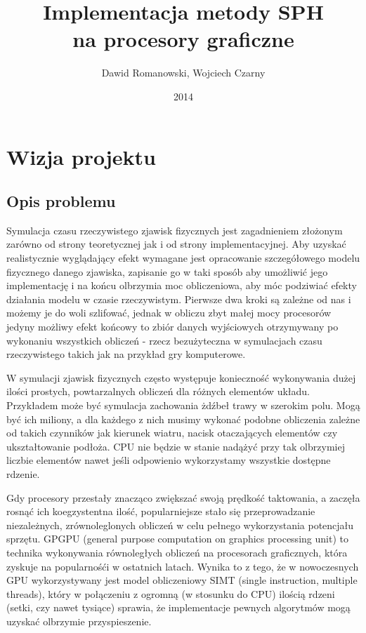 \documentclass[polish, 12pt]{aghthesis}
\author{Dawid Romanowski, Wojciech Czarny}
\title{Implementacja metody SPH \\ na procesory graficzne}
\date{2014}
\begin{document}
\raggedbottom
\maketitle{}

\tableofcontents
\clearpage

\section{Wizja projektu}


	\subsection{Opis problemu}
	
	Symulacja czasu rzeczywistego zjawisk fizycznych jest zagadnieniem złożonym zarówno od strony teoretycznej jak i od strony implementacyjnej. Aby uzyskać realistycznie wyglądający efekt wymagane jest opracowanie szczegółowego modelu fizycznego danego zjawiska, zapisanie go w taki sposób aby umożliwić jego implementację i na końcu olbrzymia moc obliczeniowa, aby móc podziwiać efekty działania modelu w czasie rzeczywistym. Pierwsze dwa kroki są zależne od nas i możemy je do woli szlifować, jednak w obliczu zbyt małej mocy procesorów jedyny możliwy efekt końcowy to zbiór danych wyjściowych otrzymywany po wykonaniu wszystkich obliczeń - rzecz bezużyteczna w symulacjach czasu rzeczywistego takich jak na przykład gry komputerowe.

	W symulacji zjawisk fizycznych często występuje konieczność wykonywania dużej ilości prostych, powtarzalnych obliczeń dla różnych elementów układu. Przykładem może być symulacja zachowania żdźbeł trawy w szerokim polu. Mogą być ich miliony, a dla każdego z nich musimy wykonać podobne obliczenia zależne od takich czynników jak kierunek wiatru, nacisk otaczających elementów czy ukształtowanie podłoża. CPU nie będzie w stanie nadążyć przy tak olbrzymiej liczbie elementów nawet jeśli odpowienio wykorzystamy wszystkie dostępne rdzenie. 
	
		Gdy procesory przestały znacząco zwiększać swoją prędkość taktowania, a zaczęła rosnąć ich koegzystentna ilość, popularniejsze stało się przeprowadzanie niezależnych, zrównoleglonych obliczeń w celu pełnego wykorzystania potencjału sprzętu. GPGPU (general purpose computation on graphics processing unit) to technika wykonywania równoległych obliczeń na procesorach graficznych, która zyskuje na popularnośći w ostatnich latach. Wynika to z tego, że w nowoczesnych GPU wykorzystywany jest model obliczeniowy SIMT (single instruction, multiple threads), który w połączeniu z ogromną (w stosunku do CPU) ilością rdzeni (setki, czy nawet tysiące) sprawia, że implementacje pewnych algorytmów mogą uzyskać olbrzymie przyspieszenie.
\end{document}
